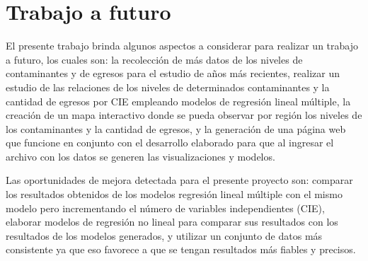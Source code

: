 
\section{Trabajo a futuro}
El presente trabajo brinda algunos aspectos a considerar para realizar un trabajo a futuro, los cuales son: la recolección de más datos de los niveles de contaminantes y de egresos para el estudio de años más recientes, realizar un estudio de las relaciones de los niveles de determinados contaminantes y la cantidad de egresos por CIE empleando modelos de regresión lineal múltiple, la creación de un mapa interactivo donde se pueda observar por región los niveles de los contaminantes y la cantidad de egresos, y la generación de una página web que funcione en conjunto con el desarrollo elaborado para que al ingresar el archivo con los datos se generen las visualizaciones y modelos.

Las oportunidades de mejora detectada para el presente proyecto son: comparar los resultados obtenidos de los modelos regresión lineal múltiple con el mismo modelo pero incrementando el número de variables independientes (CIE), elaborar modelos de regresión no lineal para comparar sus resultados con los resultados de los modelos generados, y utilizar un conjunto de datos más consistente ya que eso favorece a que se tengan resultados más fiables y precisos.


